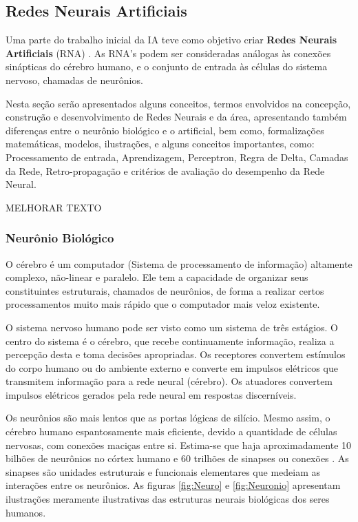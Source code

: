 \subsection{Redes Neurais Artificiais}
\label{sec:RNA}

Uma parte do trabalho inicial da IA teve como objetivo criar \textbf{Redes Neurais Artificiais} (RNA) \cite{russell2004inteligencia}. As RNA's podem ser consideradas análogas às conexões sinápticas do cérebro humano, e o conjunto de entrada às células do sistema nervoso, chamadas de neurônios. 

Nesta seção serão apresentados alguns conceitos, termos envolvidos na concepção, construção e desenvolvimento de Redes Neurais e da área, apresentando também diferenças entre o neurônio biológico e o artificial, bem como, formalizações matemáticas, modelos, ilustrações, e alguns conceitos importantes, como: Processamento de entrada, Aprendizagem, Perceptron, Regra de Delta, Camadas da Rede, Retro-propagação e critérios de avaliação do desempenho da Rede Neural.

{\color{red} MELHORAR TEXTO}

\subsubsection{Neurônio Biológico}
    O cérebro é um computador (Sistema de processamento de informação) altamente complexo, não-linear e paralelo. Ele tem a capacidade de organizar seus constituintes estruturais, chamados de neurônios, de forma a realizar certos processamentos muito mais rápido que o computador mais veloz existente.
    
    O sistema nervoso humano pode ser visto como um sistema de três estágios. O centro do sistema é o cérebro, que recebe continuamente informação, realiza a percepção desta e toma decisões apropriadas. Os receptores convertem estímulos do corpo humano ou do ambiente externo e converte em impulsos elétricos que transmitem informação para a rede neural (cérebro). Os atuadores convertem impulsos elétricos gerados pela rede neural em respostas discerníveis.
    
    Os neurônios são mais lentos que as portas lógicas de silício. Mesmo assim, o cérebro humano espantosamente mais eficiente, devido a quantidade de células nervosas, com conexões maciças entre si. Estima-se que haja aproximadamente 10 bilhões de neurônios no córtex humano e 60 trilhões de sinapses ou conexões \cite{shepherd1990synaptic}. As sinapses são unidades estruturais e funcionais elementares que medeiam as interações entre os neurônios. As figuras \ref{fig:Neuro} e \ref{fig:Neuronio} apresentam ilustrações meramente ilustrativas das estruturas neurais biológicas dos seres humanos.
    
